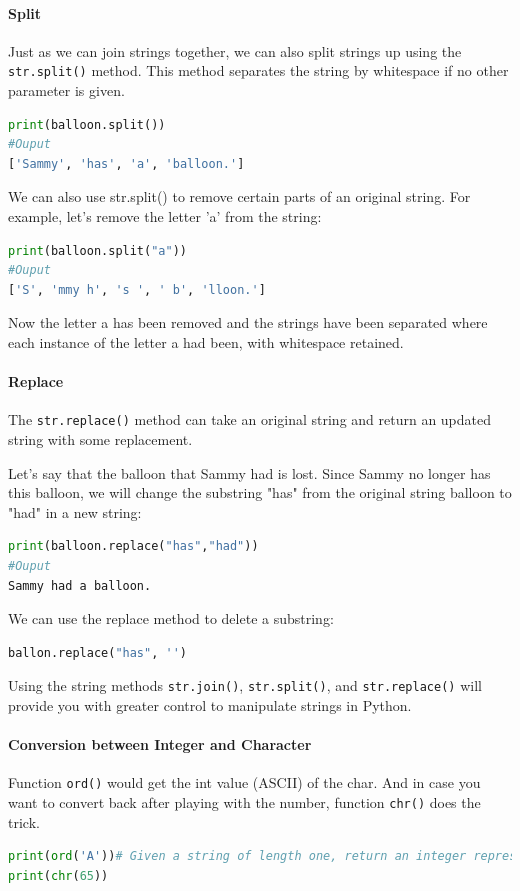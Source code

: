 \documentclass[../main.tex]{subfiles}
\begin{document}
\paragraph{Split}
Just as we can join strings together, we can also split strings up using the \texttt{str.split()} method. This method separates the string by whitespace if no other parameter is given.
\begin{lstlisting}[language=Python]
print(balloon.split())
#Ouput
['Sammy', 'has', 'a', 'balloon.']
\end{lstlisting}
We can also use str.split() to remove certain parts of an original string. For example, let’s remove the letter 'a' from the string:
\begin{lstlisting}[language=Python]
print(balloon.split("a"))
#Ouput
['S', 'mmy h', 's ', ' b', 'lloon.']
\end{lstlisting}
Now the letter a has been removed and the strings have been separated where each instance of the letter a had been, with whitespace retained.

\paragraph{Replace}The \texttt{str.replace()} method can take an original string and return an updated string with some replacement.

Let’s say that the balloon that Sammy had is lost. Since Sammy no longer has this balloon, we will change the substring "has" from the original string balloon to "had" in a new string:
\begin{lstlisting}[language=Python]
print(balloon.replace("has","had"))
#Ouput
Sammy had a balloon.
\end{lstlisting}
We can use the replace method to delete a substring:
\begin{lstlisting}[language=Python]
ballon.replace("has", '')
\end{lstlisting}
Using the string methods \texttt{str.join()}, \texttt{str.split()}, and \texttt{str.replace()} will provide you with greater control to manipulate strings in Python.

\paragraph{Conversion between Integer and Character}
Function \texttt{ord()} would get the int value (ASCII) of the char. And in case you want to convert back after playing with the number, function \texttt{chr()} does the trick.
\begin{lstlisting}[language = Python]
print(ord('A'))# Given a string of length one, return an integer representing the Unicode  code point of the character when the argument is a unicode object,
print(chr(65))
\end{lstlisting}
\end{document}
